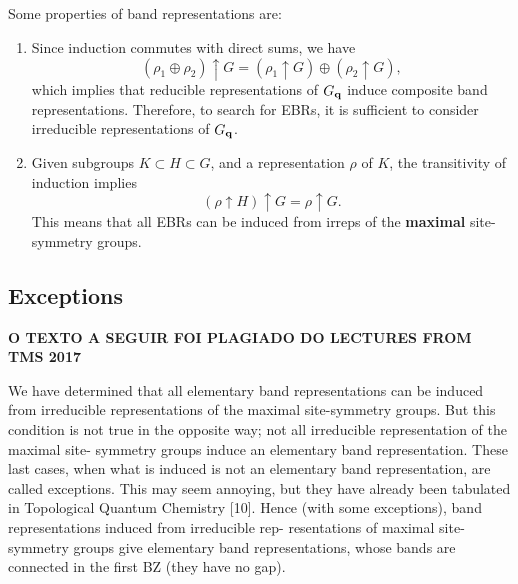 \begin{lemma} \label{lemma:properties_bandreps}
Some properties of band representations are:
\begin{enumerate}
\item Since induction commutes with direct sums, we have
\begin{equation} \label{eq:induction_directsum}
(\rho_1 \oplus \rho_2) \uparrow G = (\rho_1 \uparrow G) \oplus (\rho_2 \uparrow G),
\end{equation}
which implies that reducible representations of \( G_{\vb{q}} \) induce composite band representations. Therefore, to search for EBRs, it is sufficient to consider irreducible representations of $G_{\vb{q}}$.

\item Given subgroups \( K \subset H \subset G \), and a representation \( \rho \) of \( K \), the transitivity of induction implies
\begin{equation} \label{eq:induction_induction_subgroup_KHG}
(\rho \uparrow H) \uparrow G = \rho \uparrow G.
\end{equation}
This means that all EBRs can be induced from irreps of the \textbf{maximal} site-symmetry groups.
\end{enumerate}
\end{lemma}

\subsection{Exceptions}

\textbf{O TEXTO A SEGUIR FOI PLAGIADO DO LECTURES FROM TMS 2017}

We have determined that all elementary band representations can be induced from
irreducible representations of the maximal site-symmetry groups. But this condition
is not true in the opposite way; not all irreducible representation of the maximal site-
symmetry groups induce an elementary band representation. These last cases, when
what is induced is not an elementary band representation, are called exceptions. This
may seem annoying, but they have already been tabulated in Topological Quantum
Chemistry [10].
Hence (with some exceptions), band representations induced from irreducible rep-
resentations of maximal site-symmetry groups give elementary band representations,
whose bands are connected in the first BZ (they have no gap).

